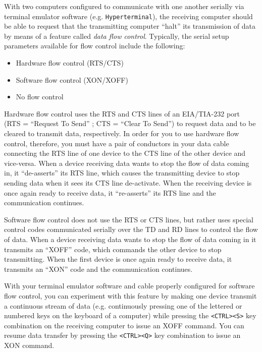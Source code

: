 

With two computers configured to communicate with one another serially via terminal emulator software (e.g. {\tt Hyperterminal}), the receiving computer should be able to request that the transmitting computer ``halt'' its transmission of data by means of a feature called {\it data flow control}.  Typically, the serial setup parameters available for flow control include the following:

\begin{itemize}
\item{} Hardware flow control (RTS/CTS)
\item{} Software flow control (XON/XOFF)
\item{} No flow control
\end{itemize}

Hardware flow control uses the RTS and CTS lines of an EIA/TIA-232 port (RTS = ``Request To Send'' ; CTS = ``Clear To Send'') to request data and to be cleared to transmit data, respectively.  In order for you to use hardware flow control, therefore, you must have a pair of conductors in your data cable connecting the RTS line of one device to the CTS line of the other device and vice-versa.  When a device receiving data wants to stop the flow of data coming in, it ``de-asserts'' its RTS line, which causes the transmitting device to stop sending data when it sees its CTS line de-activate.  When the receiving device is once again ready to receive data, it ``re-asserts'' its RTS line and the communication continues.

Software flow control does not use the RTS or CTS lines, but rather uses special control codes communicated serially over the TD and RD lines to control the flow of data.  When a device receiving data wants to stop the flow of data coming in it transmits an ``XOFF'' code, which commands the other device to stop transmitting.  When the first device is once again ready to receive data, it transmits an ``XON'' code and the communication continues.

\vskip 10pt

With your terminal emulator software and cable properly configured for software flow control, you can experiment with this feature by making one device transmit a continuous stream of data (e.g. continuously pressing one of the lettered or numbered keys on the keyboard of a computer) while pressing the {\tt <CTRL><S>} key combination on the receiving computer to issue an XOFF command.  You can resume data transfer by pressing the {\tt <CTRL><Q>} key combination to issue an XON command.

